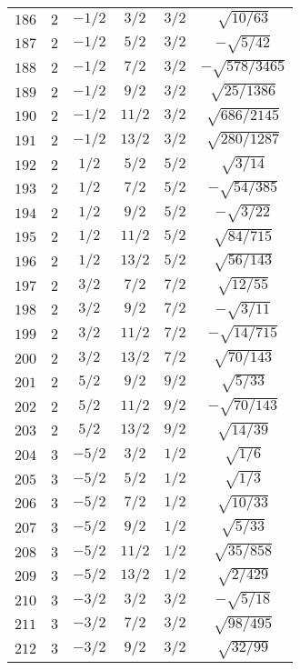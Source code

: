 \begin{table}
\begin{center}
\begin{tabular}{|c|c|c|c|c|c|}
$186$ & $2$ & $-1/2$ & $3/2$ & $3/2$ & $\sqrt{10/63}$ \\ 
$187$ & $2$ & $-1/2$ & $5/2$ & $3/2$ & $-\sqrt{5/42}$ \\ 
$188$ & $2$ & $-1/2$ & $7/2$ & $3/2$ & $-\sqrt{578/3465}$ \\ 
$189$ & $2$ & $-1/2$ & $9/2$ & $3/2$ & $\sqrt{25/1386}$ \\ 
$190$ & $2$ & $-1/2$ & $11/2$ & $3/2$ & $\sqrt{686/2145}$ \\ 
$191$ & $2$ & $-1/2$ & $13/2$ & $3/2$ & $\sqrt{280/1287}$ \\ 
$192$ & $2$ & $1/2$ & $5/2$ & $5/2$ & $\sqrt{3/14}$ \\ 
$193$ & $2$ & $1/2$ & $7/2$ & $5/2$ & $-\sqrt{54/385}$ \\ 
$194$ & $2$ & $1/2$ & $9/2$ & $5/2$ & $-\sqrt{3/22}$ \\ 
$195$ & $2$ & $1/2$ & $11/2$ & $5/2$ & $\sqrt{84/715}$ \\ 
$196$ & $2$ & $1/2$ & $13/2$ & $5/2$ & $\sqrt{56/143}$ \\ 
$197$ & $2$ & $3/2$ & $7/2$ & $7/2$ & $\sqrt{12/55}$ \\ 
$198$ & $2$ & $3/2$ & $9/2$ & $7/2$ & $-\sqrt{3/11}$ \\ 
$199$ & $2$ & $3/2$ & $11/2$ & $7/2$ & $-\sqrt{14/715}$ \\ 
$200$ & $2$ & $3/2$ & $13/2$ & $7/2$ & $\sqrt{70/143}$ \\ 
$201$ & $2$ & $5/2$ & $9/2$ & $9/2$ & $\sqrt{5/33}$ \\ 
$202$ & $2$ & $5/2$ & $11/2$ & $9/2$ & $-\sqrt{70/143}$ \\ 
$203$ & $2$ & $5/2$ & $13/2$ & $9/2$ & $\sqrt{14/39}$ \\ 
$204$ & $3$ & $-5/2$ & $3/2$ & $1/2$ & $\sqrt{1/6}$ \\ 
$205$ & $3$ & $-5/2$ & $5/2$ & $1/2$ & $\sqrt{1/3}$ \\ 
$206$ & $3$ & $-5/2$ & $7/2$ & $1/2$ & $\sqrt{10/33}$ \\ 
$207$ & $3$ & $-5/2$ & $9/2$ & $1/2$ & $\sqrt{5/33}$ \\ 
$208$ & $3$ & $-5/2$ & $11/2$ & $1/2$ & $\sqrt{35/858}$ \\ 
$209$ & $3$ & $-5/2$ & $13/2$ & $1/2$ & $\sqrt{2/429}$ \\ 
$210$ & $3$ & $-3/2$ & $3/2$ & $3/2$ & $-\sqrt{5/18}$ \\ 
$211$ & $3$ & $-3/2$ & $7/2$ & $3/2$ & $\sqrt{98/495}$ \\ 
$212$ & $3$ & $-3/2$ & $9/2$ & $3/2$ & $\sqrt{32/99}$ \\ 

\end{tabular}
\end{center}
\end{table}

